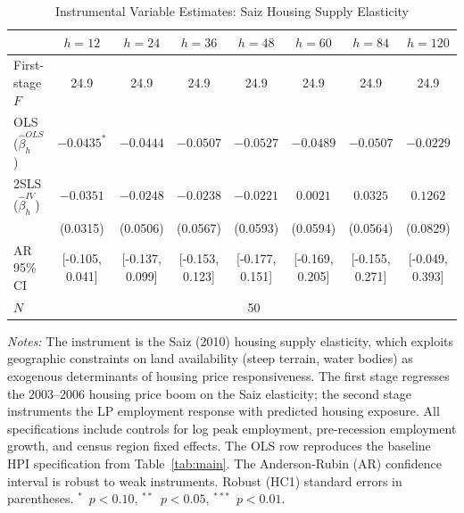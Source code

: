 \begin{table}[H]
\centering
\caption{Instrumental Variable Estimates: Saiz Housing Supply Elasticity}
\begin{threeparttable}
\small
\begin{tabular}{lccccccc}
\toprule
& $h=12$ & $h=24$ & $h=36$ & $h=48$ & $h=60$ & $h=84$ & $h=120$ \\
\midrule
First-stage $F$ & 24.9 & 24.9 & 24.9 & 24.9 & 24.9 & 24.9 & 24.9 \\
OLS ($\hat{\beta}^{OLS}_h$) & $-0.0435^{*}$ & $-0.0444$ & $-0.0507$ & $-0.0527$ & $-0.0489$ & $-0.0507$ & $-0.0229$ \\
2SLS ($\hat{\beta}^{IV}_h$) & $-0.0351$ & $-0.0248$ & $-0.0238$ & $-0.0221$ & $0.0021$ & $0.0325$ & $0.1262$ \\
  & (0.0315) & (0.0506) & (0.0567) & (0.0593) & (0.0594) & (0.0564) & (0.0829) \\
AR 95\% CI & [-0.105, 0.041] & [-0.137, 0.099] & [-0.153, 0.123] & [-0.177, 0.151] & [-0.169, 0.205] & [-0.155, 0.271] & [-0.049, 0.393] \\
\midrule
$N$ & \multicolumn{7}{c}{50} \\
\bottomrule
\end{tabular}
\begin{tablenotes}[flushleft]
\small
\item \textit{Notes:} The instrument is the Saiz (2010) housing supply elasticity, which exploits geographic constraints on land availability (steep terrain, water bodies) as exogenous determinants of housing price responsiveness. The first stage regresses the 2003--2006 housing price boom on the Saiz elasticity; the second stage instruments the LP employment response with predicted housing exposure. All specifications include controls for log peak employment, pre-recession employment growth, and census region fixed effects. The OLS row reproduces the baseline HPI specification from Table~\ref{tab:main}. The Anderson-Rubin (AR) confidence interval is robust to weak instruments. Robust (HC1) standard errors in parentheses. $^{*}$~$p<0.10$, $^{**}$~$p<0.05$, $^{***}$~$p<0.01$.
\end{tablenotes}
\end{threeparttable}
\label{tab:saiz_iv}
\end{table}
